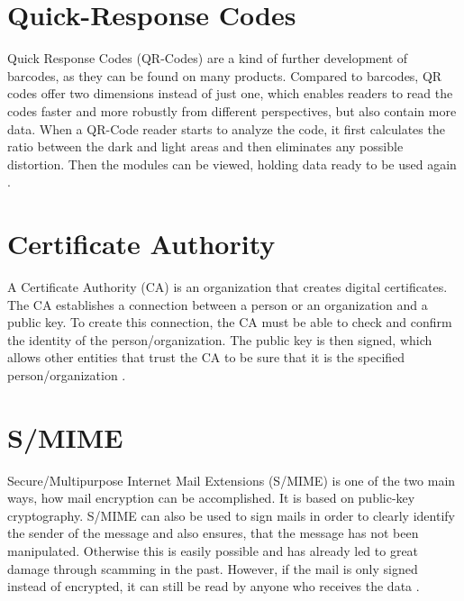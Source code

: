 \documentclass[12pt,oneside,a4paper,parskip]{scrbook}
\begin{document}
\section{Quick-Response Codes}

Quick Response Codes (QR-Codes) are a kind of further development of barcodes, as they can be found on many products. Compared to barcodes, QR codes offer two dimensions instead of just one, which enables readers to read the codes faster and more robustly from different perspectives, but also contain more data. When a QR-Code reader starts to analyze the code, it first calculates the ratio between the dark and light areas and then eliminates any possible distortion. Then the modules can be viewed, holding data ready to be used again \parencite{Sangeeta_qr_2016}.

\section{Certificate Authority}
\label{sec:CA}

A Certificate Authority (CA) is an organization that creates digital certificates. The CA establishes a connection between a person or an organization and a public key. To create this connection, the CA must be able to check and confirm the identity of the person/organization. The public key is then signed, which allows other entities that trust the CA to be sure that it is the specified person/organization \parencite{luber_ca_2018}.


\section{S/MIME}
Secure/Multipurpose Internet Mail Extensions (S/MIME) is one of the two main ways, how mail encryption can be accomplished. It is based on public-key cryptography. S/MIME can also be used to sign mails in order to clearly identify the sender of the message and also ensures, that the message has not been manipulated. 
Otherwise this is easily possible and has already led to great damage through scamming in the past. However, if the mail is only signed instead of encrypted, it can still be read by anyone who receives the data \parencite{villadiego_dangers_2017}.
\end{document}
